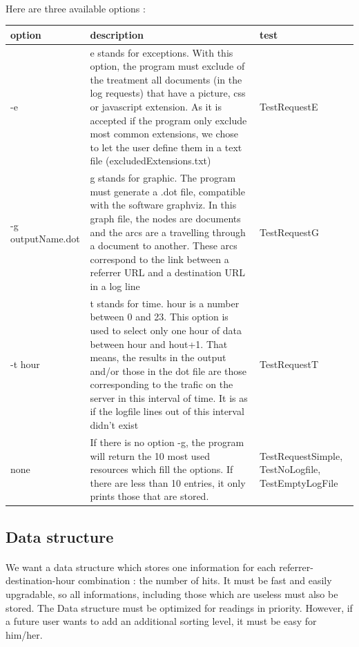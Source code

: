 \documentclass[a4paper, 12pts]{article}
\begin{document}
\paragraph{} 
 Here are three available options :
\begin{center}
   \begin{tabular}{| p{1cm} | p{9.5cm} | p{3cm} |}
	\hline
	option & description & test\\ \hline
	-e & e stands for exceptions. With this option, the program must exclude of the treatment all documents (in the log requests) that have a picture, css or javascript extension. As it is accepted if the program only exclude most common extensions, we chose to let the user define them in a text file (excludedExtensions.txt) & TestRequestE\\ \hline
	-g outputName.dot & g stands for graphic. The program must generate a .dot file, compatible with the software graphviz. In this graph file, the nodes are documents and the arcs are a travelling through a document to another. These arcs correspond to the link between a referrer URL and a destination URL in a log line & TestRequestG\\ \hline
	-t hour & t stands for time. hour is a number between 0 and 23. This option is used to select only one hour of data between hour and hout+1. That means, the results in the output and/or those in the dot file are those corresponding to the trafic on the server in this interval of time. It is as if the logfile lines out of this interval didn't exist & TestRequestT\\ \hline
	none & If there is no option -g, the program will return the 10 most used resources which fill the options. If there are less than 10 entries, it only prints those that are stored. & TestRequestSimple, TestNoLogfile, TestEmptyLogFile\\ \hline
   \end{tabular}
\end{center} 

\subsection{Data structure}
\paragraph{}
 We want a data structure which stores one information for each referrer-destination-hour combination : the number of hits. It must be fast and easily upgradable, so all informations, including those which are useless must also be stored.
 The Data structure must be optimized for readings in priority. However, if a future user wants to add an additional sorting level, it must be easy for him/her.
 
\end{document}
